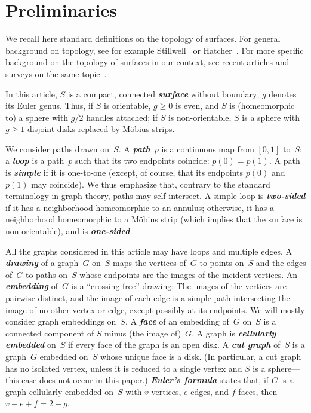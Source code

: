\documentclass[11pt]{article}
\newcommand{\emphdef}[1]{\textcolor{blueblack}{\textbf{\emph{#1}}}}
\theoremstyle{plain}  \newtheorem{theorem}{Theorem}[section]
\theoremstyle{definition}
\begin{document}
\section{Preliminaries}\label{S:prelim}

We recall here standard definitions on the topology of surfaces.  For
general background on topology, see for example Stillwell~\cite{s-ctcgt-93}
or Hatcher~\cite{h-at-02}.  For more specific background on the topology of
surfaces in our context, see recent articles and surveys on the same
topic~\cite{ce-tnpcs-10,c-tags-12}.

In this article, $S$ is a compact, connected \emphdef{surface} without
boundary; $g$ denotes its Euler genus.  Thus, if $S$ is orientable,
$g\geq0$ is even, and $S$ is (homeomorphic to) a sphere with $g/2$ handles
attached; if $S$ is non-orientable, $S$ is a sphere with $g\geq1$ disjoint
disks replaced by M\"obius strips.

We consider paths drawn on~$S$.  A \emphdef{path}~$p$ is a continuous map
from $[0,1]$ to~$S$; a \emphdef{loop} is a path~$p$ such that its two
endpoints coincide: $p(0)=p(1)$.  A path is \emphdef{simple} if it is
one-to-one (except, of course, that its endpoints $p(0)$ and~$p(1)$ may
coincide).  We thus emphasize that, contrary to the standard terminology in
graph theory, paths may self-intersect.  A simple loop is
\emphdef{two-sided} if it has a neighborhood homeomorphic to an annulus;
otherwise, it has a neighborhood homeomorphic to a M\"obius strip (which
implies that the surface is non-orientable), and is \emphdef{one-sided}.

All the graphs considered in this article may have loops and multiple
edges.  A \emphdef{drawing} of a graph~$G$ on~$S$ maps the vertices of~$G$
to points on~$S$ and the edges of~$G$ to paths on~$S$ whose endpoints are
the images of the incident vertices.  An \emphdef{embedding} of~$G$ is a
``crossing-free'' drawing: The images of the vertices are pairwise
distinct, and the image of each edge is a simple path intersecting the
image of no other vertex or edge, except possibly at its endpoints.  We
will mostly consider graph embeddings on~$S$.  A \emphdef{face} of an
embedding of~$G$ on~$S$ is a connected component of $S$ minus (the image
of)~$G$.  A graph is \emphdef{cellularly embedded} on~$S$ if every face of
the graph is an open disk.  A \emphdef{cut graph} of~$S$ is a graph~$G$
embedded on~$S$ whose unique face is a disk.  (In particular, a cut graph
has no isolated vertex, unless it is reduced to a single vertex and $S$ is
a sphere---this case does not occur in this paper.)  \emphdef{Euler's
  formula} states that, if $G$ is a graph cellularly embedded on~$S$ with
$v$ vertices, $e$ edges, and $f$ faces, then $v-e+f=2-g$.
\end{document}
